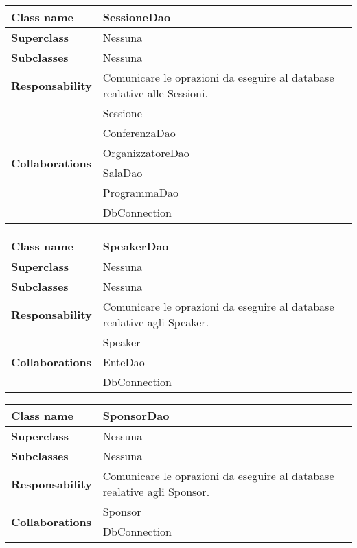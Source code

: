 \begin{table}[h!]
	\begin{tabular}{|l|l|}
		\hline 
		\textbf{Class name} & SessioneDao
		\\ \hline
		\textbf{Superclass} & Nessuna
		\\ \hline
		\multirow{1}{*}{\textbf{Subclasses}} & Nessuna
		\\ \hline
		\textbf{Responsability} & Comunicare le oprazioni da eseguire al database realative alle Sessioni.
		\\ \hline
		\multirow{6}{*}{\textbf{Collaborations}} & Sessione \\ 
		& ConferenzaDao \\
		& OrganizzatoreDao \\
		& SalaDao \\
		& ProgrammaDao \\
		& DbConnection \\ \hline
	\end{tabular}
\end{table}
\newpage

\begin{table}[h!]
	\begin{tabular}{|l|l|}
		\hline 
		\textbf{Class name} & SpeakerDao
		\\ \hline
		\textbf{Superclass} & Nessuna
		\\ \hline
		\multirow{1}{*}{\textbf{Subclasses}} & Nessuna
		\\ \hline
		\textbf{Responsability} & Comunicare le oprazioni da eseguire al database realative agli Speaker.
		\\ \hline
		\multirow{3}{*}{\textbf{Collaborations}} & Speaker \\ 
		& EnteDao \\
		& DbConnection \\ \hline
	\end{tabular}
\end{table}

\begin{table}[h!]
	\begin{tabular}{|l|l|}
		\hline 
		\textbf{Class name} & SponsorDao
		\\ \hline
		\textbf{Superclass} & Nessuna
		\\ \hline
		\multirow{1}{*}{\textbf{Subclasses}} & Nessuna
		\\ \hline
		\textbf{Responsability} & Comunicare le oprazioni da eseguire al database realative agli Sponsor.
		\\ \hline
		\multirow{2}{*}{\textbf{Collaborations}} & Sponsor \\ 
		& DbConnection \\ \hline
	\end{tabular}
\end{table}

